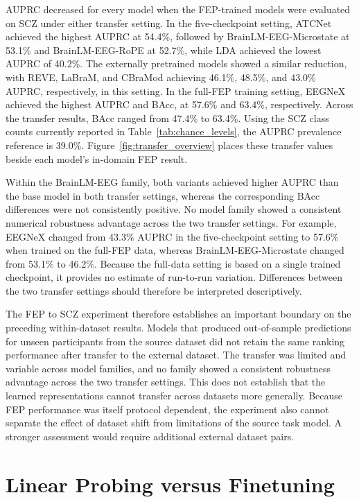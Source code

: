AUPRC decreased for every model when the FEP-trained models were evaluated on
SCZ under either transfer setting. In the five-checkpoint setting, ATCNet
achieved the highest AUPRC at 54.4\%, followed by BrainLM-EEG-Microstate at
53.1\% and BrainLM-EEG-RoPE at 52.7\%, while LDA achieved the lowest AUPRC of 40.2\%. The
externally pretrained models showed a similar reduction, with REVE, LaBraM, and
CBraMod achieving 46.1\%, 48.5\%, and 43.0\% AUPRC, respectively, in this
setting. In the
full-FEP training setting, EEGNeX achieved the highest AUPRC and BAcc, at
57.6\% and 63.4\%, respectively. Across the transfer results, BAcc ranged from
47.4\% to 63.4\%. Using the SCZ class counts currently reported in
Table~\ref{tab:chance_levels}, the AUPRC prevalence reference is 39.0\%.
Figure~\ref{fig:transfer_overview} places these transfer values beside each
model's in-domain FEP result.

Within the BrainLM-EEG family, both variants achieved higher AUPRC than the base model in both transfer settings, whereas the corresponding BAcc differences were not consistently positive. No model family showed a consistent numerical robustness advantage across the
two transfer settings. For example, EEGNeX changed from 43.3\% AUPRC in the
five-checkpoint setting to 57.6\% when trained on the full-FEP data, whereas BrainLM-EEG-Microstate changed from 53.1\% to 46.2\%. Because
the full-data setting is based on a single trained checkpoint, it provides no
estimate of run-to-run variation. Differences between the two transfer
settings should therefore be interpreted descriptively.

The FEP to SCZ experiment therefore establishes an important
boundary on the preceding within-dataset results. Models that produced
out-of-sample predictions for unseen participants from the source dataset did
not retain the same ranking performance after transfer to the external
dataset. The transfer was limited and variable across model families, and no
family showed a consistent robustness advantage across the two transfer
settings. This does not establish that the learned representations cannot
transfer across datasets more generally. Because FEP performance was itself
protocol dependent, the experiment also cannot separate the effect of dataset
shift from limitations of the source task model. A stronger assessment would
require additional external dataset pairs.


\section{Linear Probing versus Finetuning}\label{sec:r_finetune}

